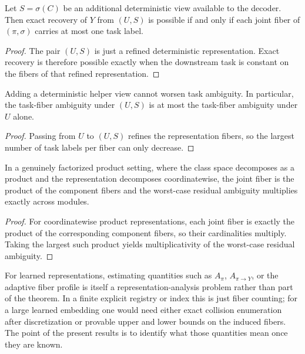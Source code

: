 \begin{theorem}\label{thm:helper-view-sufficiency}
Let $S=\sigma(C)$ be an additional deterministic view available to the decoder. Then exact recovery of $Y$ from $(U,S)$ is possible if and only if each joint fiber of $(\pi,\sigma)$ carries at most one task label.
\end{theorem}

\begin{proof}
The pair $(U,S)$ is just a refined deterministic representation. Exact recovery is therefore possible exactly when the downstream task is constant on the fibers of that refined representation.
\end{proof}

\begin{corollary}\label{cor:helper-view-mono}
Adding a deterministic helper view cannot worsen task ambiguity. In particular, the task-fiber ambiguity under $(U,S)$ is at most the task-fiber ambiguity under $U$ alone.
\end{corollary}

\begin{proof}
Passing from $U$ to $(U,S)$ refines the representation fibers, so the largest number of task labels per fiber can only decrease.
\end{proof}

\begin{corollary}\label{cor:factorized-product-law}
In a genuinely factorized product setting, where the class space decomposes as a product and the representation decomposes coordinatewise, the joint fiber is the product of the component fibers and the worst-case residual ambiguity multiplies exactly across modules.
\end{corollary}

\begin{proof}
For coordinatewise product representations, each joint fiber is exactly the product of the corresponding component fibers, so their cardinalities multiply. Taking the largest such product yields multiplicativity of the worst-case residual ambiguity.
\end{proof}

For learned representations, estimating quantities such as $A_\pi$, $A_{\pi \to Y}$, or the adaptive fiber profile is itself a representation-analysis problem rather than part of the theorem. In a finite explicit registry or index this is just fiber counting; for a large learned embedding one would need either exact collision enumeration after discretization or provable upper and lower bounds on the induced fibers. The point of the present results is to identify what those quantities mean once they are known.

